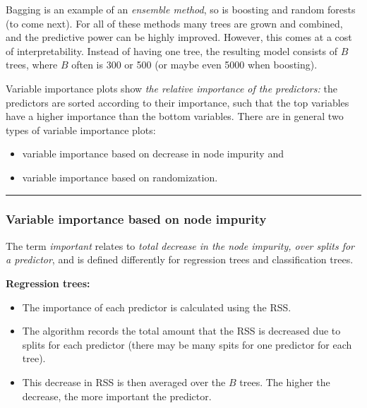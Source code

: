 \documentclass[]{article}
\providecommand{\tightlist}{%
  \setlength{\itemsep}{0pt}\setlength{\parskip}{0pt}}
\begin{document}
Bagging is an example of an \emph{ensemble method}, so is boosting and
random forests (to come next). For all of these methods many trees are
grown and combined, and the predictive power can be highly improved.
However, this comes at a cost of interpretability. Instead of having one
tree, the resulting model consists of \(B\) trees, where \(B\) often is
300 or 500 (or maybe even 5000 when boosting).

Variable importance plots show \emph{the relative importance of the
predictors:} the predictors are sorted according to their importance,
such that the top variables have a higher importance than the bottom
variables. There are in general two types of variable importance plots:

\begin{itemize}
\tightlist
\item
  variable importance based on decrease in node impurity and
\item
  variable importance based on randomization.
\end{itemize}

\begin{center}\rule{0.5\linewidth}{\linethickness}\end{center}

\hypertarget{variable-importance-based-on-node-impurity}{%
\subsubsection{Variable importance based on node
impurity}\label{variable-importance-based-on-node-impurity}}

The term \emph{important} relates to \emph{total decrease in the node
impurity, over splits for a predictor}, and is defined differently for
regression trees and classification trees.

\textbf{Regression trees:}

\begin{itemize}
\tightlist
\item
  The importance of each predictor is calculated using the RSS.
\item
  The algorithm records the total amount that the RSS is decreased due
  to splits for each predictor (there may be many spits for one
  predictor for each tree).
\item
  This decrease in RSS is then averaged over the \(B\) trees. The higher
  the decrease, the more important the predictor.
\end{itemize}
\end{document}

